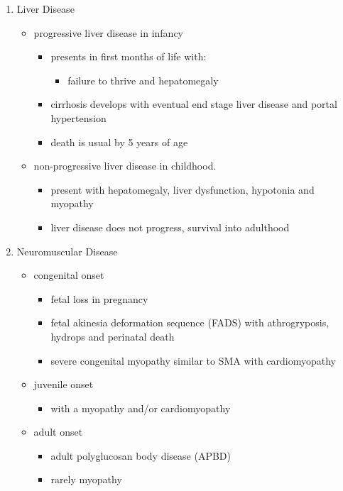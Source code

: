 \documentclass{scrartcl}
\begin{document}
\begin{enumerate}
\item Liver Disease
\label{sec:org6fb750b}
\begin{itemize}
\item progressive liver disease in infancy
\begin{itemize}
\item presents in first months of life with:
\begin{itemize}
\item failure to thrive and hepatomegaly
\end{itemize}
\item cirrhosis develops with eventual end stage liver disease and
portal hypertension
\item death is usual by 5 years of age
\end{itemize}
\item non-progressive liver disease in childhood.
\begin{itemize}
\item present with hepatomegaly, liver dysfunction, hypotonia and
myopathy
\item liver disease does not progress, survival into adulthood
\end{itemize}
\end{itemize}

\item Neuromuscular Disease
\label{sec:orgba5cb08}
\begin{itemize}
\item congenital onset
\begin{itemize}
\item fetal loss in pregnancy
\item fetal akinesia deformation sequence (FADS) with athrogryposis, hydrops and perinatal death
\item severe congenital myopathy similar to SMA with \textpm{} cardiomyopathy
\end{itemize}
\item juvenile onset
\begin{itemize}
\item with a myopathy and/or cardiomyopathy
\end{itemize}
\item adult onset
\begin{itemize}
\item adult polyglucosan body disease (APBD)
\item rarely myopathy
\end{itemize}
\end{itemize}
\end{enumerate}
\end{document}
